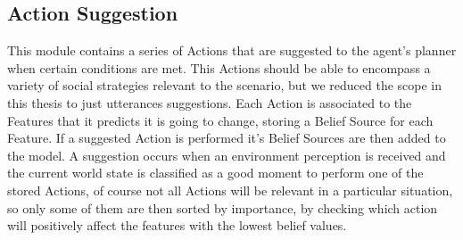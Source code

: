 \subsection{Action Suggestion}
This module contains a series of Actions that are suggested to the agent's planner when certain conditions are met. This Actions should be able to encompass a variety of social strategies relevant to the scenario, but we reduced the scope in this thesis to just utterances suggestions. Each Action is associated to the Features that it predicts it is going to change, storing a Belief Source for each Feature. If a suggested Action is performed it's Belief Sources are then added to the model. A suggestion occurs when an environment perception is received and the current world state is classified as a good moment to perform one of the stored Actions, of course not all Actions will be relevant in a particular situation, so only some of them are then sorted by importance, by checking which action will positively affect the features with the lowest belief values.



